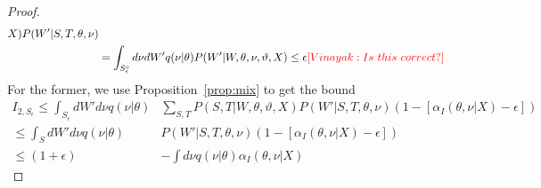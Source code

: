 \begin{proof}
\begin{align*}
X)P(W' | S, T, \theta, \nu) \\ 
& = \int_{S^c_{\epsilon}} d\nu dW'
q(\nu | \theta) P(W' |  W, \theta, \nu, \vartheta, X) 
\le \epsilon 
\textcolor{red}{[Vinayak: Is\ this\ correct?]}
\end{align*}
{For the former, we use Proposition~\ref{prop:mix} to get the bound}
\begin{align*}
I_{2,S_{\epsilon}} \le \int_{S_\epsilon}dW' d\nu q(\nu | \theta) &
  \sum_{S,T} P(S, T | W, \theta, \vartheta, X)P(W' | S, T, \theta, \nu) 
  ( 1 - [\alpha_I(\theta, \nu | X)-\epsilon]) \\
\le \int_{S}dW' d\nu q(\nu | \theta) &
  P(W' | S, T, \theta, \nu) 
  ( 1 - [\alpha_I(\theta, \nu | X)-\epsilon]) \\
  \le (1+\epsilon) & - \int d\nu q(\nu | \theta) \alpha_I(\theta, \nu | X) 
\end{align*}


\end{proof}
